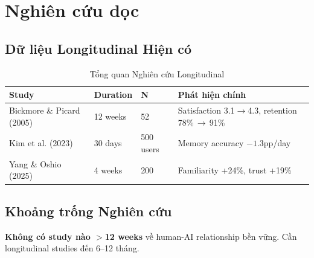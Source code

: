 \section{Nghiên cứu dọc}

\subsection{Dữ liệu Longitudinal Hiện có}

\begin{table}[H]
\centering
\caption{Tổng quan Nghiên cứu Longitudinal}
\label{tab:longitudinal}
\begin{tabular}{llll}
\toprule
\textbf{Study} & \textbf{Duration} & \textbf{N} & \textbf{Phát hiện chính} \\
\midrule
Bickmore \& Picard (2005) & 12 weeks & 52 & Satisfaction 3.1$\to$4.3, retention 78\%\,$\to$\,91\% \\
Kim et al. (2023) & 30 days & 500 users & Memory accuracy $-1.3$pp/day \\
Yang \& Oshio (2025) & 4 weeks & 200 & Familiarity +24\%, trust +19\% \\
\bottomrule
\end{tabular}
\end{table}

\subsection{Khoảng trống Nghiên cứu}

\textbf{Không có study nào $>$12 weeks} về human-AI relationship bền vững. Cần longitudinal studies đến 6--12 tháng.

